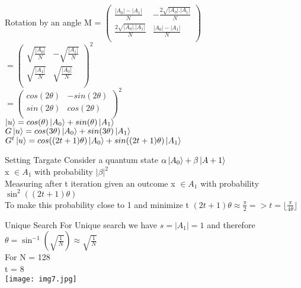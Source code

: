 \documentclass[12pt]{beamer}
\begin{document}
\begin{frame}{Rotation by an angle}
M = $
\begin{pmatrix}
\frac{|A_0|-|A_1|}{N} &  - \frac{2 \sqrt{|A_0|.|A_1|}}{N}\\
\frac{2 \sqrt{|A_0|.|A_1|}}{N} & \frac{|A_0|-|A_1|}{N}\\
\end{pmatrix}$\\
$ = 
\begin{pmatrix}
\sqrt{\frac{|A_0|}{N}} &  - \sqrt{\frac{|A_1|}{N}}\\
\sqrt{\frac{|A_1|}{N}} & \sqrt{\frac{|A_0|}{N}}\\
\end{pmatrix}^{2}$\\
$ = 
\begin{pmatrix}
cos(2\theta) &  - sin(2\theta)\\
sin(2\theta) & cos(2\theta) \\
\end{pmatrix}^{2}$\\
\vspace{1cm}
$\ket{u} = cos(\theta)\ket{A_0} + sin(\theta)\ket{A_1}$\\
$G \ket{u} = cos(3\theta)\ket{A_0} + sin(3\theta)\ket{A_1}$\\
$G^t \ket{u} = cos((2t+1)\theta)\ket{A_0} + sin((2t+1)\theta)\ket{A_1}$\\
\end{frame}
\begin{frame}{Setting Targate}
Consider a quantum state 
$\alpha\ket{A_0} + \beta\ket{A+1}$\\
\hspace{1cm}
x $\in A_1$ with probability $|\beta|^2$\\
Measuring after t iteration given an outcome x $\in A_1$ with probability \\
\hspace{2cm}
$\sin^2((2t+1)\theta)$\\
\vspace{1cm}
To make this probability close to 1 and minimize t $(2t+1)\theta \approx \frac{\pi}{2} => t =   \lfloor \frac{\pi}{4\theta} \rfloor   $

\end{frame}
\begin{frame}{Unique Search}
For Unique search we have $ s = |A_1| = 1$ and therefore \\
\hspace{2cm}
$\theta = \sin^{-1}(\sqrt{\frac{1}{N}}) \approx \sqrt{\frac{1}{N}} $\\
For N = 128 \\
\hspace{2cm}
 t = 8\\
\texttt{[image: img7.jpg]} 
\end{frame}
\end{document}
